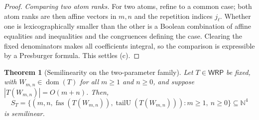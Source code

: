 \documentclass[11pt]{article}
\newtheorem{theorem}{Theorem}[section]
\theoremstyle{definition}
\newcommand{\N}{\mathbb N}
\newcommand{\WRP}{\mathsf{WRP}}
\newcommand{\fas}{\operatorname{fas}}
\newcommand{\tailU}{\operatorname{tailU}}
\begin{document}
\begin{proof}
\vspace{0.5em}
\noindent\emph{Comparing two atom ranks.}  For two atoms, refine to a common case; both
atom ranks are then affine vectors in $m,n$ and the repetition indices $j_\ell$.
Whether one is lexicographically smaller than the other is a Boolean
combination of affine equalities and inequalities and the congruences defining
the case.  Clearing the fixed denominators makes all coefficients integral, so
the comparison is expressible by a Presburger formula.  This
settles (c).
\end{proof}

\begin{theorem}[Semilinearity on the two-parameter family]
\label{thm:two-parameter-semilinearity}
Let $T\in\WRP$ be fixed, with
$W_{m,n}\in\operatorname{dom}(T)$ for all $m\ge1$ and $n\ge0$, and suppose
$|T(W_{m,n})|=O(m+n)$.  Then,
\[
   S_T=\bigl\{(m,n,\fas(T(W_{m,n})),\tailU(T(W_{m,n}))):m\ge 1,\ n\ge 0\bigr\}
   \subseteq\N^4
\]
is semilinear.
\end{theorem}
\end{document}
